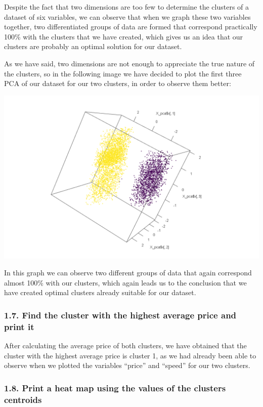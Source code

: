 \documentclass[
]{article}
\begin{document}
Despite the fact that two dimensions are too few to determine the
clusters of a dataset of six variables, we can observe that when we
graph these two variables together, two differentiated groups of data
are formed that correspond practically 100\% with the clusters that we
have created, which gives us an idea that our clusters are probably an
optimal solution for our dataset.

As we have said, two dimensions are not enough to appreciate the true
nature of the clusters, so in the following image we have decided to
plot the first three PCA of our dataset for our two clusters, in order
to observe them better:

\includegraphics[width=1\linewidth]{3firstpca}

In this graph we can observe two different groups of data that again
correspond almost 100\% with our clusters, which again leads us to the
conclusion that we have created optimal clusters already suitable for
our dataset.

\hypertarget{find-the-cluster-with-the-highest-average-price-and-print-it}{%
\subsubsection{1.7. Find the cluster with the highest average price and
print
it}\label{find-the-cluster-with-the-highest-average-price-and-print-it}}

After calculating the average price of both clusters, we have obtained
that the cluster with the highest average price is cluster 1, as we had
already been able to observe when we plotted the variables ``price'' and
``speed'' for our two clusters.

\hypertarget{print-a-heat-map-using-the-values-of-the-clusters-centroids}{%
\subsubsection{1.8. Print a heat map using the values of the clusters
centroids}\label{print-a-heat-map-using-the-values-of-the-clusters-centroids}}
\end{document}
